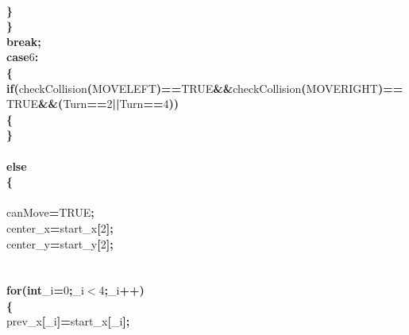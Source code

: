 \documentclass[a4paper, 10pt]{article}
\newcommand\SPC{\hspace*{0.6em}}
\newcommand{\CppAIdentifier}[1]{#1}
\newcommand{\CppANumber}[1]{\textcolor[rgb]{0.5,0,0.5}{#1}}
\newcommand{\CppAReservedWord}[1]{\textbf{#1}}
\newcommand{\CppASpace}[1]{\colorbox[rgb]{1,1,1}{#1}}
\newcommand{\CppASymbol}[1]{\textbf{\textcolor[rgb]{1,0,0}{#1}}}
\begin{document}
\begin{ttfamily}
\\
\CppASpace{\SPC \SPC \SPC }\CppASymbol{\}}\\
\CppASpace{\SPC \SPC }\CppASymbol{\}}\\
\CppASpace{\SPC \SPC }\CppAReservedWord{break}\CppASymbol{;}\\
\CppASpace{\SPC \SPC }\CppAReservedWord{case}\CppASpace{\SPC }\CppANumber{6}\CppASymbol{:}\\
\CppASpace{\SPC \SPC }\CppASymbol{\{}\\
\CppASpace{\SPC \SPC \SPC }\CppAReservedWord{if}\CppASymbol{(}\CppAIdentifier{checkCollision}\CppASymbol{(}\CppAIdentifier{MOVELEFT}\CppASymbol{)}\CppASymbol{==}\CppAIdentifier{TRUE}\CppASymbol{\&\&}\CppAIdentifier{checkCollision}\CppASymbol{(}\CppAIdentifier{MOVERIGHT}\CppASymbol{)}\CppASymbol{==}\CppAIdentifier{TRUE}\CppASymbol{\&\&}\CppASymbol{(}\CppAIdentifier{Turn}\CppASymbol{==}\CppANumber{2}\CppASymbol{||}\CppAIdentifier{Turn}\CppASymbol{==}\CppANumber{4}\CppASymbol{)}\CppASymbol{)}\\
\CppASpace{\SPC \SPC \SPC }\CppASymbol{\{}\\
\CppASpace{\SPC \SPC \SPC }\CppASymbol{\}}\\
\\
\CppASpace{\SPC \SPC \SPC }\CppAReservedWord{else}\\
\CppASpace{\SPC \SPC \SPC }\CppASymbol{\{}\\
\\
\CppASpace{\SPC \SPC \SPC \SPC }\CppAIdentifier{canMove}\CppASymbol{=}\CppAIdentifier{TRUE}\CppASymbol{;}\\
\CppASpace{\SPC \SPC \SPC \SPC }\CppAIdentifier{center\_x}\CppASymbol{=}\CppAIdentifier{start\_x}\CppASymbol{[}\CppANumber{2}\CppASymbol{]}\CppASymbol{;}\\
\CppASpace{\SPC \SPC \SPC \SPC }\CppAIdentifier{center\_y}\CppASymbol{=}\CppAIdentifier{start\_y}\CppASymbol{[}\CppANumber{2}\CppASymbol{]}\CppASymbol{;}\\
\\
\\
\CppASpace{\SPC \SPC \SPC \SPC }\CppAReservedWord{for}\CppASymbol{(}\CppAReservedWord{int}\CppASpace{\SPC }\CppAIdentifier{\_i}\CppASymbol{=}\CppANumber{0}\CppASymbol{;}\CppAIdentifier{\_i}\CppASymbol{$<$}\CppANumber{4}\CppASymbol{;}\CppAIdentifier{\_i}\CppASymbol{++}\CppASymbol{)}\\
\CppASpace{\SPC \SPC \SPC \SPC }\CppASymbol{\{}\\
\CppASpace{\SPC \SPC \SPC \SPC \SPC }\CppAIdentifier{prev\_x}\CppASymbol{[}\CppAIdentifier{\_i}\CppASymbol{]}\CppASymbol{=}\CppAIdentifier{start\_x}\CppASymbol{[}\CppAIdentifier{\_i}\CppASymbol{]}\CppASymbol{;}\\

\end{ttfamily}
\end{document}

